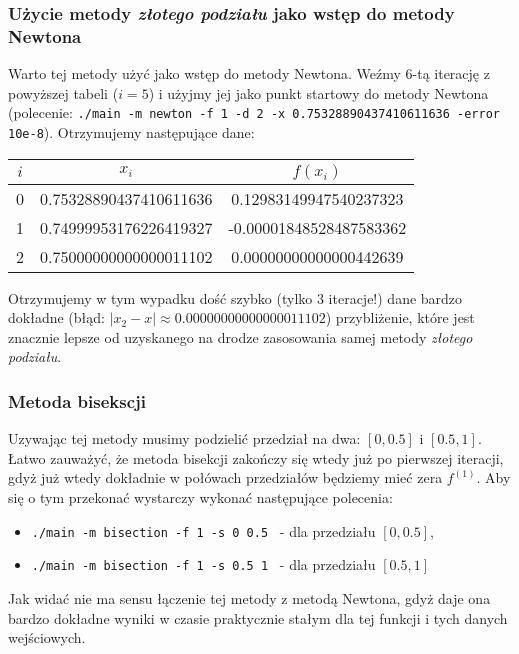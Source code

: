 \documentclass[a4paper,11pt]{article}
\begin{document}
    \subsubsection{Użycie metody \emph{złotego podziału} jako wstęp do metody Newtona}
    Warto tej metody użyć jako wstęp do metody Newtona. Weźmy 6-tą iterację z powyższej tabeli ($ i = 5 $) i użyjmy jej jako punkt startowy do metody Newtona (polecenie: \texttt{./main -m newton -f 1 -d 2 -x 0.75328890437410611636 -error 10e-8}). Otrzymujemy następujące dane:
     \begin{center}
      \begin{tabular}{S[table-format=1.0]S[table-format=-1.9]S[table-format=-1.15,table-auto-round=false]}
        \toprule
        {$i$}                & {$x_i$}               & {$f(x_i)$}            \\  & 0.75328890437410611636 & 0.12983149947540237323 \\
         1 & 0.74999953176226419327 & -0.00001848528487583362 \\
         2 & 0.75000000000000011102 & 0.00000000000000442639 \\ \bottomrule
      \end{tabular}
    \end{center}
  Otrzymujemy w tym wypadku dość szybko (tylko 3 iteracje!) dane bardzo dokładne (błąd: $ |x_2 - x| \approx 0.00000000000000011102 $) przybliżenie, które jest znacznie lepsze od uzyskanego na drodze zasosowania samej metody \emph{złotego podziału}. 
    
  \subsubsection{Metoda bisekscji}
  Uzywając tej metody musimy podzielić przedział na dwa: $ [0, 0.5] $ i $ [0.5, 1]$. Łatwo zauważyć, że metoda bisekcji zakończy się wtedy już po pierwszej iteracji, gdyż już wtedy dokładnie w połówach przedziałów będziemy mieć zera $f^{(1)}$. Aby się o tym przekonać wystarczy wykonać następujące polecenia:
  \begin{itemize}
    \item \texttt{./main -m bisection -f 1 -s 0 0.5 } - dla przedziału $[0, 0.5]$,
    \item \texttt{./main -m bisection -f 1 -s 0.5 1 } - dla przedziału $[0.5, 1]$
  \end{itemize}
  Jak widać nie ma sensu łączenie tej metody z metodą Newtona, gdyż daje ona bardzo dokładne wyniki w czasie praktycznie stałym dla tej funkcji i tych danych wejściowych.
  
\end{document}
